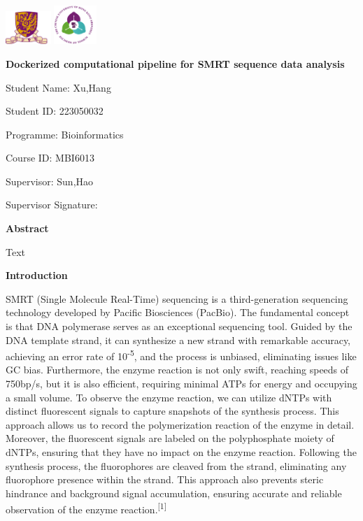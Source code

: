 \documentclass[
]{article}
\author{}
\date{}
\begin{document}
\includegraphics[width=0.67431in,height=0.49306in]{图片1.png}
\includegraphics[width=0.63264in,height=0.57639in]{图片2.png}

\textbf{Dockerized computational pipeline for SMRT sequence data
analysis}

Student Name: Xu,Hang

Student ID: 223050032

Programme: Bioinformatics

Course ID: MBI6013

Supervisor: Sun,Hao

Supervisor Signature:

\textbf{Abstract}

Text

\textbf{\hfill\break
}

\textbf{Introduction}

SMRT (Single Molecule Real-Time) sequencing is a third-generation
sequencing technology developed by Pacific Biosciences (PacBio). The
fundamental concept is that DNA polymerase serves as an exceptional
sequencing tool. Guided by the DNA template strand, it can synthesize a
new strand with remarkable accuracy, achieving an error rate of
10\textsuperscript{-5}, and the process is unbiased, eliminating issues
like GC bias. Furthermore, the enzyme reaction is not only swift,
reaching speeds of 750bp/s, but it is also efficient, requiring minimal
ATPs for energy and occupying a small volume. To observe the enzyme
reaction, we can utilize dNTPs with distinct fluorescent signals to
capture snapshots of the synthesis process. This approach allows us to
record the polymerization reaction of the enzyme in detail. Moreover,
the fluorescent signals are labeled on the polyphosphate moiety of
dNTPs, ensuring that they have no impact on the enzyme reaction.
Following the synthesis process, the fluorophores are cleaved from the
strand, eliminating any fluorophore presence within the strand. This
approach also prevents steric hindrance and background signal
accumulation, ensuring accurate and reliable observation of the enzyme
reaction.\textsuperscript{{[}1{]}}
\end{document}
